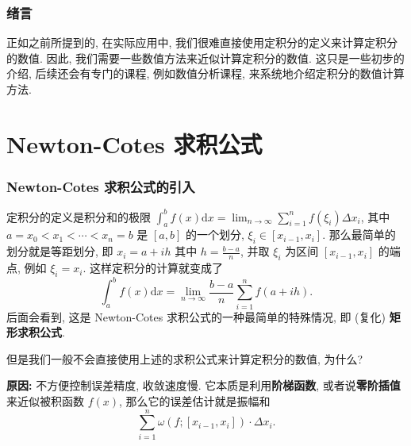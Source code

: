 
\begin{frame}
\frametitle{绪言}

{
\larger[1]
正如之前所提到的, 在实际应用中, 我们很难直接使用定积分的定义来计算定积分的数值. 因此, 我们需要一些数值方法来近似计算定积分的数值. 这只是一些初步的介绍, 后续还会有专门的课程, 例如数值分析课程, 来系统地介绍定积分的数值计算方法.
}

\end{frame}


\section{Newton-Cotes 求积公式}


\begin{frame}
\frametitle{Newton-Cotes 求积公式的引入}

\begin{recall}
定积分的定义是积分和的极限 $\int_a^b f(x) \mathrm{d}x = \lim_{n \to \infty} \sum_{i=1}^n f(\xi_i) \Delta x_i$, 其中 $a = x_0 < x_1 < \cdots < x_n = b$ 是 $[a, b]$ 的一个划分, $\xi_i \in [x_{i-1}, x_i]$. 那么最简单的划分就是等距划分, 即 $x_i = a + i h$ 其中 $h = \frac{b - a}{n}$, 并取 $\xi_i$ 为区间 $[x_{i-1}, x_i]$ 的端点, 例如 $\xi_i = x_i$. 这样定积分的计算就变成了
\[
\int_a^b f(x) \mathrm{d}x = \lim_{n \to \infty} \frac{b - a}{n} \sum_{i=1}^n f(a + i h).
\]
后面会看到, 这是 Newton-Cotes 求积公式的一种最简单的特殊情况, 即 (复化) \textbf{矩形求积公式}.
\end{recall}

但是我们一般不会直接使用上述的求积公式来计算定积分的数值, \alert{为什么?}

\pause
\vspace{0.5em}

\textbf{原因:} 不方便控制误差精度, 收敛速度慢.
\pause
它本质是利用\textbf{阶梯函数}, 或者说\textbf{零阶插值}来近似被积函数 $f(x)$, 那么它的误差估计就是振幅和
\[
\sum_{i=1}^n \omega(f; [x_{i-1}, x_i]) \cdot \Delta x_i.
\]

\end{frame}


